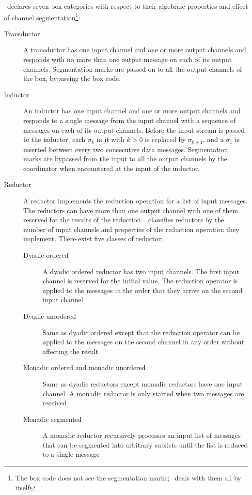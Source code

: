 \ak\ declares seven box categories with respect to their algebraic properties and effect of channel segmentation\footnote{The box code does not see the segmentation marks; \ak\ deals with them all by itself}:
\begin{description}
\item[Transductor]
A transductor has one input channel and one or more output channels and responds with no more than one output message on each of its output channels. Segmentation marks are passed on to all the output channels of the box, bypassing the box code.

\item[Inductor]
An inductor has one input channel and one or more output channels and responds to a single message from the input channel with a sequence of messages on each of its output channels. Before the input stream is passed to the inductor, each $\sigma_k$ in it with $k > 0$ is replaced by $\sigma_{k+1}$, and a $\sigma_1$ is inserted between every two consecutive data messages. Segmentation marks are bypassed from the input to all the output channels by the coordinator when encountered at the input of the inductor.

\item[Reductor] A reductor implements the reduction operation for a list of input messages. The reductors can have more than one output channel with one of them reserved for the results of the reduction. \ak\ classifies reductors by the number of input channels and properties of the reduction operation they implement. There exist five classes of reductor:

    \begin{description}
    \item[Dyadic ordered] A dyadic ordered reductor has two input channels. The first input channel is reserved for the initial value. The reduction operator is applied to the messages in the order that they arrive on the second input channel

    \item[Dyadic unordered] Same as dyadic ordered except that the reduction operator can be applied to the messages on the second channel in any order without affecting the result

    \item[Monadic ordered and monadic unordered] Same as dyadic reductors except monadic reductors have one input channel. A monadic reductor is only started when two messages are received

    \item[Monadic segmented] A monadic reductor recursively processes an input list of messages that can be segmented into arbitrary sublists until the list is reduced to a single message
    \end{description}
\end{description}


